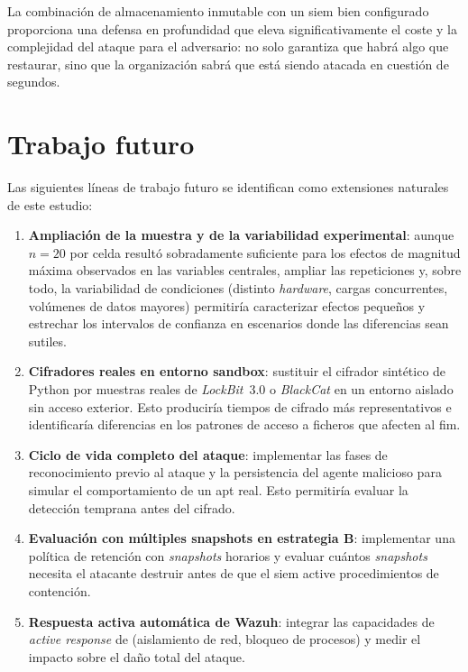 \documentclass[../main.tex]{subfiles}
\begin{document}
La combinación de almacenamiento inmutable con un \gls{siem} bien configurado
proporciona una defensa en profundidad que eleva significativamente el coste y la
complejidad del ataque para el adversario: no solo garantiza que habrá algo que
restaurar, sino que la organización sabrá que está siendo atacada en cuestión de
segundos.

\section{Trabajo futuro}

Las siguientes líneas de trabajo futuro se identifican como extensiones naturales
de este estudio:

\begin{enumerate}[label=TF\arabic*., leftmargin=2.5cm]

  \item \textbf{Ampliación de la muestra y de la variabilidad experimental}: aunque
  $n = 20$ por celda resultó sobradamente suficiente para los efectos de magnitud
  máxima observados en las variables centrales, ampliar las repeticiones y, sobre
  todo, la variabilidad de condiciones (distinto \emph{hardware}, cargas
  concurrentes, volúmenes de datos mayores) permitiría caracterizar efectos
  pequeños y estrechar los intervalos de confianza en escenarios donde las
  diferencias sean sutiles.

  \item \textbf{Cifradores reales en entorno sandbox}: sustituir el cifrador
  sintético de Python por muestras reales de \emph{LockBit}~3.0 o \emph{BlackCat}
  en un entorno aislado sin acceso exterior. Esto produciría tiempos de cifrado
  más representativos e identificaría diferencias en los patrones de acceso a
  ficheros que afecten al \gls{fim}.

  \item \textbf{Ciclo de vida completo del ataque}: implementar las fases de
  reconocimiento previo al ataque y la persistencia del agente malicioso para
  simular el comportamiento de un \gls{apt} real. Esto permitiría evaluar la
  detección temprana antes del cifrado.

  \item \textbf{Evaluación con múltiples snapshots en estrategia B}: implementar
  una política de retención con \emph{snapshots} horarios y evaluar cuántos
  \emph{snapshots} necesita el atacante destruir antes de que el \gls{siem} active
  procedimientos de contención.

  \item \textbf{Respuesta activa automática de Wazuh}: integrar las capacidades
  de \emph{active response} de \wazuh (aislamiento de red, bloqueo de procesos)
  y medir el impacto sobre el daño total del ataque.


\end{enumerate}
\end{document}
